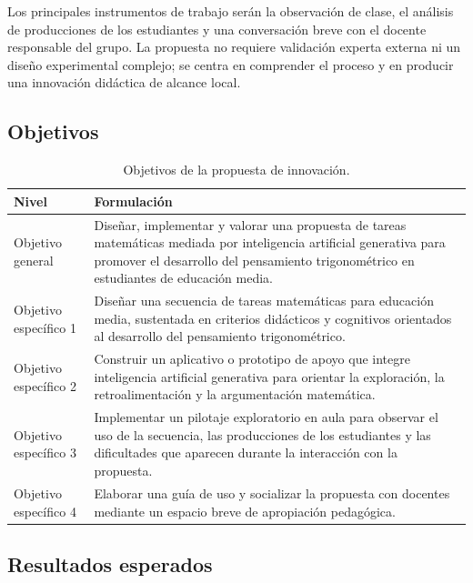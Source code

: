\documentclass[11pt,spanish,letterpaper,openany]{book}
\begin{document}
Los principales instrumentos de trabajo serán la observación de clase, el análisis de producciones de los estudiantes y una conversación breve con el docente responsable del grupo. La propuesta no requiere validación experta externa ni un diseño experimental complejo; se centra en comprender el proceso y en producir una innovación didáctica de alcance local.

\subsection{Objetivos}

\begin{table}[H]
\centering
\caption{Objetivos de la propuesta de innovación.}
\begin{tabularx}{\textwidth}{>{\raggedright\arraybackslash}p{3.3cm} >{\raggedright\arraybackslash}X}
\toprule
Nivel & Formulación \\
\midrule
Objetivo general & Diseñar, implementar y valorar una propuesta de tareas matemáticas mediada por inteligencia artificial generativa para promover el desarrollo del pensamiento trigonométrico en estudiantes de educación media. \\
Objetivo específico 1 & Diseñar una secuencia de tareas matemáticas para educación media, sustentada en criterios didácticos y cognitivos orientados al desarrollo del pensamiento trigonométrico. \\
Objetivo específico 2 & Construir un aplicativo o prototipo de apoyo que integre inteligencia artificial generativa para orientar la exploración, la retroalimentación y la argumentación matemática. \\
Objetivo específico 3 & Implementar un pilotaje exploratorio en aula para observar el uso de la secuencia, las producciones de los estudiantes y las dificultades que aparecen durante la interacción con la propuesta. \\
Objetivo específico 4 & Elaborar una guía de uso y socializar la propuesta con docentes mediante un espacio breve de apropiación pedagógica. \\
\bottomrule
\end{tabularx}
\end{table}

\subsection{Resultados esperados}
\end{document}
